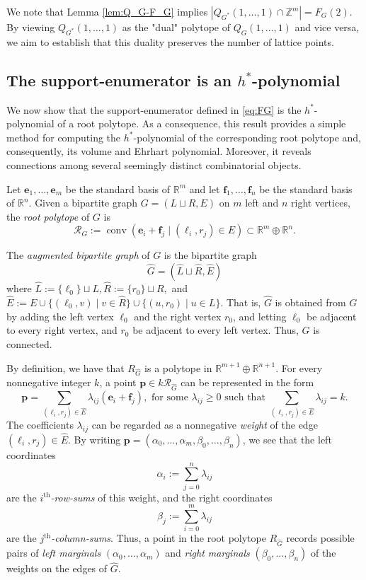 \documentclass[11pt,a4paper]{article}
\newcommand{\vct}[1]{\boldsymbol{#1}}
\newcommand{\R}{\mathbb{R}}
\newcommand{\Z}{\mathbb{Z}}
\newcommand{\conv}{\operatorname{conv}}
\newcommand{\1}{\mathbf{1}}
\theoremstyle{plain}
\theoremstyle{definition}
\begin{document}
We note that Lemma \ref{lem:Q_G-F_G} implies $|Q_{G^*}(1, \dots, 1)\cap\Z^m|= F_{G}(2).$ By viewing $Q_{G^*}(1, \dots, 1)$ as the "dual" polytope of $Q_{G}(1, \dots, 1)$ and vice versa, we aim to establish that this duality preserves the number of lattice points.

\subsection{The support-enumerator is an $h^*$-polynomial}\label{sec:h-polynomial}

We now show that the support-enumerator defined in \eqref{eq:FG} is the $h^*$-polynomial of a root polytope. As a consequence, this result provides a simple method for computing the $h^*$-polynomial of the corresponding root polytope and, consequently, its volume and Ehrhart polynomial. Moreover, it reveals connections among several seemingly distinct combinatorial objects.

Let $\vct{e}_1,\ldots,\vct{e}_m$ be the standard basis of $\R^{m}$ and let $\vct{f}_1,\ldots,\vct{f}_n$ be the standard basis of $\R^{n}$. Given a bipartite graph $G=(L\sqcup R,E)$ on $m$ left and $n$ right vertices, the \emph{root polytope} of $G$ is
\begin{equation}
\mathcal R_{G}
:=\conv(\vct{e}_i+\vct{f}_j\mid (\ell_i,r_j)\in E)
\subset\R^{m}\oplus\R^{n}.
\label{eq:root-polytope}
\end{equation}

The \emph{augmented bipartite graph} of $G$ is the bipartite graph 
\[
\widehat G=(\widehat L\sqcup\widehat R,\widehat E)
\]
where $\widehat L:=\{\ell_0\}\sqcup L, 
\widehat R:=\{r_0\}\sqcup R,$ and $ 
\widehat E
:=E\cup\{(\ell_0,v)\mid v\in\widehat R\}
\cup\{(u,r_0)\mid u\in L\}.$
That is, $\widehat G$ is obtained from $G$ by adding the left vertex $\ell_0$ and the right vertex $r_0$, and letting $\ell_0$ be adjacent to every right vertex, and $r_0$ be adjacent to every left vertex. Thus, $\widehat G$ is connected.

By definition, we have that $R_{\widehat G}$ is a polytope in $\R^{m+1}\oplus \R^{n+1}$. For every nonnegative integer $k$, a point $\vct{p}\in k\mathcal R_{\widehat G}$ can be represented in the form
\begin{equation}
\vct{p}
=\sum_{(\ell_i,r_j)\in\widehat E}\lambda_{ij}(\vct{e}_i+\vct{f}_j),
\text{ for some }
\lambda_{ij}\ge0 \text{ such that }
\sum_{(\ell_i,r_j)\in\widehat E}\lambda_{ij}=k.
\label{eq:flow}
\end{equation}
The coefficients $\lambda_{ij}$ can be regarded as a nonnegative \emph{weight} of the edge $(\ell_i,r_j) \in \widehat E$. By writing $\vct{p} = (\alpha_0,\dots, \alpha_m,\beta_0,\dots, \beta_n)$, we see that the left coordinates
\[
\alpha_i:=\sum_{j=0}^n\lambda_{ij}
\]
are the \emph{$i^{\mathrm{th}}$-row-sums} of this weight, and the right coordinates
\[
\beta_j:=\sum_{i=0}^m\lambda_{ij}
\]
are the \emph{$j^{\mathrm{th}}$-column-sums}. Thus, a point in the root polytope $R_{\widehat G}$ records possible pairs of \emph{left marginals} $(\alpha_0,\dots, \alpha_m)$ and \emph{right marginals} $(\beta_0,\dots,\beta_n)$ of the weights on the edges of $\widehat G$.
\end{document}
